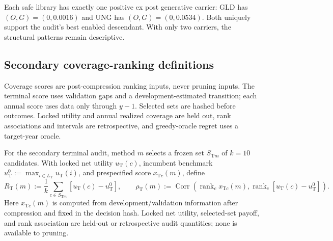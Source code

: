 Each safe library has exactly one positive ex post generative carrier: GLD has
\((O,G)=(0,0.0016)\) and UNG has \((O,G)=(0,0.0534)\).  Both uniquely support
the audit's best enabled descendant.  With only two carriers, the structural
patterns remain descriptive.

\begin{table}[htbp]
  \centering
  \scriptsize
  \renewcommand{\arraystretch}{0.92}
  
  \caption{Locked financial designs, compression diagnostics, and secondary
  coverage outcomes.  Pruning uses the validation frontier and, for
  innovation-safe deletion, structural closure.  Compression and policy
  characteristics are post-pruning descriptions.  Coverage scores are fixed
  from validation or pre-target data after compression.  The \(Q_a\) entries
  and displayed performance outcomes use held-out data and are not pruning
  inputs, forecasts, policy scores, or deployable criteria.  The audits use
  different held-out estimands.}
  \label{tab:supp-financial-design-summary}
\end{table}

\subsection{Secondary coverage-ranking definitions}
\label{sec:supp-financial-coverage}

Coverage scores are post-compression ranking inputs, never pruning inputs.
The terminal score uses validation gaps and a development-estimated
transition; each annual score uses data only through \(y-1\).  Selected sets
are hashed before outcomes.  Locked utility and annual realized coverage are
held out, rank associations and intervals are retrospective, and
greedy-oracle regret uses a target-year oracle.

For the secondary terminal audit, method \(m\) selects a frozen set
\(S_{\mathrm Tm}\) of \(k=10\) candidates.  With locked net utility
\(u_{\mathrm T}(c)\), incumbent benchmark
\(u_{\mathrm T}^0:=\max_{i\in L_{\mathrm T}}u_{\mathrm T}(i)\), and
prespecified score \(x_{\mathrm Tc}(m)\), define
\[
 R_{\mathrm T}(m):=\frac1k\sum_{c\in S_{\mathrm Tm}}
   [u_{\mathrm T}(c)-u_{\mathrm T}^0],\qquad
 \rho_{\mathrm T}(m):=
 \operatorname{Corr}\!\left(
   \operatorname{rank}_c x_{\mathrm Tc}(m),
   \operatorname{rank}_c[u_{\mathrm T}(c)-u_{\mathrm T}^0]\right).
\]
Here \(x_{\mathrm Tc}(m)\) is computed from development/validation information
after compression and fixed in the decision hash.  Locked net utility,
selected-set payoff, and rank association are held-out or retrospective audit
quantities; none is available to pruning.

